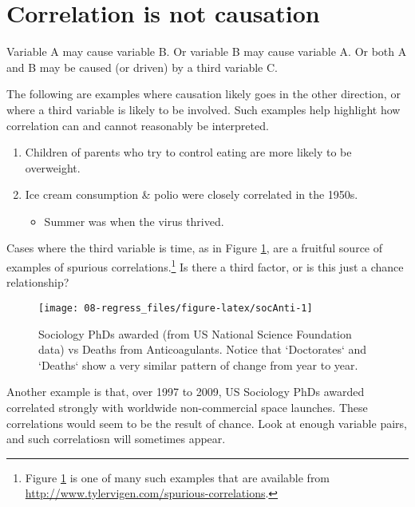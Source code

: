 \documentclass[
  10ptls,
  b5paper]{book}
\providecommand{\tightlist}{%
  \setlength{\itemsep}{0pt}\setlength{\parskip}{0pt}}
\begin{document}
\hypertarget{correlation-is-not-causation}{%
\section{Correlation is not causation}\label{correlation-is-not-causation}}

Variable A may cause variable B. Or variable B may cause variable A. Or both A and B may be caused (or driven) by a third variable C.

The following are examples where causation likely goes in the other direction, or where a third variable is likely to be involved. Such examples help highlight how correlation can and cannot reasonably be interpreted.

\begin{enumerate}
\def\labelenumi{\arabic{enumi}.}
\tightlist
\item
  Children of parents who try to control eating are more likely to be overweight.
\item
  Ice cream consumption \& polio were closely correlated in the 1950s.

  \begin{itemize}
  \tightlist
  \item
    Summer was when the virus thrived.
  \end{itemize}
\end{enumerate}

Cases where the third variable is time, as in Figure \ref{fig:socAnti}, are a fruitful source of examples of spurious correlations.\footnote{Figure \ref{fig:socAnti} is one of many such examples that are available from\\
  \url{http://www.tylervigen.com/spurious-correlations}.} Is there a third factor, or is this just a chance relationship?

\begin{figure}

{\centering \texttt{[image: 08-regress\_files/figure-latex/socAnti-1]} 

}

\caption{Sociology PhDs awarded (from US National Science 
Foundation data) vs Deaths from Anticoagulants.  Notice
that `Doctorates` and `Deaths` show a very similar pattern
of change from year to year.}\label{fig:socAnti}
\end{figure}

Another example is that, over 1997 to 2009, US Sociology PhDs awarded correlated strongly with worldwide non-commercial space launches. These correlations would seem to be the result of chance. Look at enough variable pairs, and such correlatiosn will sometimes appear.
\end{document}
